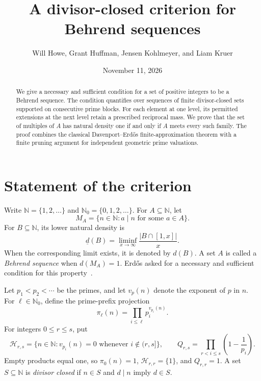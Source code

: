 \documentclass[11pt]{amsart}
\title[Divisor-closed families and Behrend sequences]{A divisor-closed criterion for Behrend sequences}
\author[Howe, Huffman, Kohlmeyer, and Kruer]{Will Howe, Grant Huffman, Jensen Kohlmeyer, and Liam Kruer}
\date{November 11, 2026}
\theoremstyle{definition}
\numberwithin{equation}{section}
\newcommand{\N}{\mathbb N}
\newcommand{\Nzero}{\mathbb N_0}
\newcommand{\Hblock}[2]{\mathcal H_{#1,#2}}
\begin{document}
\begin{abstract}
We give a necessary and sufficient condition for a set of positive integers to be a Behrend sequence.
The condition quantifies over sequences of finite divisor-closed sets supported on consecutive prime blocks.
For each element at one level, its permitted extensions at the next level retain a prescribed reciprocal mass.
We prove that the set of multiples of $A$ has natural density one if and only if $A$ meets every such family.
The proof combines the classical Davenport--Erd\H{o}s finite-approximation theorem with a finite pruning argument for independent geometric prime valuations.
\end{abstract}

\maketitle

\section{Statement of the criterion}

Write $\N=\{1,2,\ldots\}$ and $\Nzero=\{0,1,2,\ldots\}$.
For $A\subseteq\N$, let
\begin{equation}\label{eq:multiples}
  M_A=\{n\in\N: a\mid n\text{ for some }a\in A\}.
\end{equation}
For $B\subseteq\N$, its lower natural density is
\[
  \underline d(B)=\liminf_{x\to\infty}\frac{|B\cap[1,x]|}{x}.
\]
When the corresponding limit exists, it is denoted by $d(B)$.
A set $A$ is called a \emph{Behrend sequence} when $d(M_A)=1$.
Erd\H{o}s asked for a necessary and sufficient condition for this property~\cite[p.~77]{Erdos1979}.

Let $p_1<p_2<\cdots$ be the primes, and let $v_p(n)$ denote the exponent of $p$ in $n$.
For $\ell\in\Nzero$, define the prime-prefix projection
\begin{equation}\label{eq:projection}
  \pi_\ell(n)=\prod_{i\leq\ell}p_i^{v_{p_i}(n)}.
\end{equation}
For integers $0\leq r\leq s$, put
\begin{equation}\label{eq:blocks}
  \Hblock{r}{s}
  =\{n\in\N: v_{p_i}(n)=0\text{ whenever }i\notin(r,s]\},
  \qquad
  Q_{r,s}=\prod_{r<i\leq s}\left(1-\frac1{p_i}\right).
\end{equation}
Empty products equal one, so $\pi_0(n)=1$, $\Hblock{r}{r}=\{1\}$, and $Q_{r,r}=1$.
A set $S\subseteq\N$ is \emph{divisor closed} if $n\in S$ and $d\mid n$ imply $d\in S$.
\end{document}
